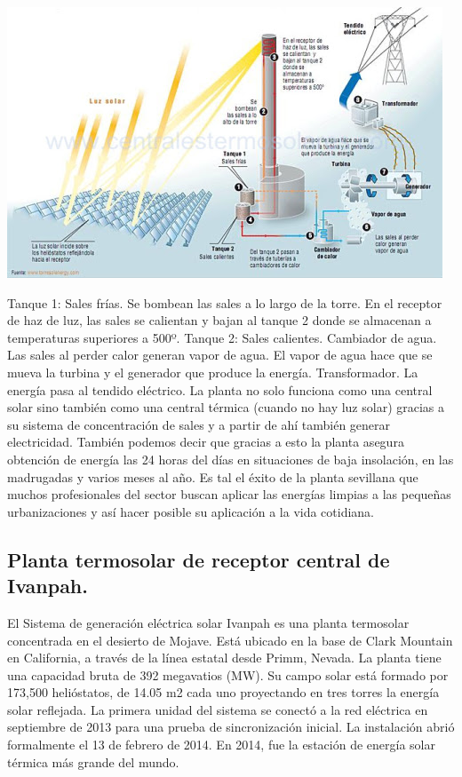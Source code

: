 \documentclass[12pt]{article}
\begin{document}
\includegraphics[width=\textwidth]{unnamed (8).jpg}

Tanque 1: Sales frías.
Se bombean las sales a lo largo de la torre.
En el receptor de haz de luz, las sales se calientan y bajan al tanque 2 donde se almacenan a temperaturas superiores a 500º.
Tanque 2: Sales calientes.
Cambiador de agua.
Las sales al perder calor generan vapor de agua.
El vapor de agua hace que se mueva la turbina y el generador que produce la energía.
Transformador. La energía pasa al tendido eléctrico.
La planta no solo funciona como una central solar sino también como una central térmica (cuando no hay luz solar) gracias a su sistema de concentración de sales y a partir de ahí también generar electricidad. También podemos decir que gracias a esto la planta asegura obtención de energía las 24 horas del días en situaciones de baja insolación, en las madrugadas y varios meses al año.
Es tal el éxito de la planta sevillana que muchos profesionales del sector buscan aplicar las energías limpias a las pequeñas urbanizaciones y así hacer posible su aplicación a la vida cotidiana. \cite{PonsWebSite}



\subsection{Planta termosolar de receptor central de Ivanpah.}

El Sistema de generación eléctrica solar Ivanpah es una planta termosolar concentrada en el desierto de Mojave. Está ubicado en la base de Clark Mountain en California, a través de la línea estatal desde Primm, Nevada. La planta tiene una capacidad bruta de 392 megavatios (MW). Su campo solar está formado por 173,500 helióstatos, de 14.05 m2 cada uno proyectando en tres torres la energía solar reflejada. La primera unidad del sistema se conectó a la red eléctrica en septiembre de 2013 para una prueba de sincronización inicial. La instalación abrió formalmente el 13 de febrero de 2014. En 2014, fue la estación de energía solar térmica más grande del mundo.
 
\end{document}
